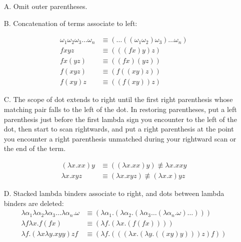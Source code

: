 \documentclass[11pt]{article}
\begin{document}
\begin{itemize}

\item[A.] Omit outer parentheses.

\item[B.] Concatenation of terms associate to left:

\begin{align*}
\omega_1\omega_2\omega_3\ldots\omega_n & \equiv (\ldots((\omega_1\omega_2)\omega_3)\ldots\omega_n)\\
fxyz & \equiv   (((fx)y)z)\\
fx(yz) & \equiv   ((fx)(yz))\\
f(xyz) & \equiv   (f((xy)z))\\
f(xy)z & \equiv   ((f(xy))z)
\end{align*}

\item[C.] The scope of dot extends to right until the first right parenthesis whose matching pair falls to the left of the dot. In restoring parentheses, put a left parenthesis just before the first lambda sign you encounter to the left of the dot, then start to scan rightwards, and put a right parenthesis at the point you encounter a right parenthesis unmatched during your rightward scan or the end of the term.

\begin{align*}
(\lambda x.xx)y & \equiv ((\lambda x.xx)y) \not\equiv \lambda x.xxy\\
\lambda x.xyz & \equiv (\lambda x.xyz) \not\equiv (\lambda x. x)yz
\end{align*}

\item[D.] Stacked lambda binders associate to right, and dots between lambda binders are deleted:
\begin{align*}
\lambda \alpha_1\lambda \alpha_2\lambda \alpha_3\ldots\lambda \alpha_n.\omega &\equiv (\lambda\alpha_1.(\lambda\alpha_2.(\lambda\alpha_3\ldots(\lambda\alpha_n.\omega)\ldots)))\\
\lambda f \lambda x.f(fx)  &\equiv  (\lambda f.(\lambda x.(f(fx))))\\
\lambda f.(\lambda x\lambda y.xyy)zf & \equiv (\lambda f.(((\lambda x.(\lambda y.((xy)y)))z)f))
\end{align*}

\end{itemize}
\end{document}
